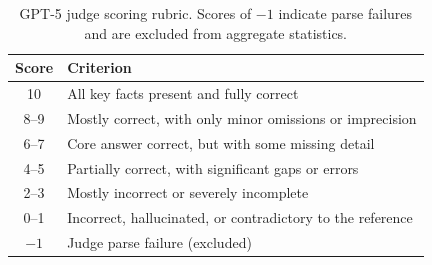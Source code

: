 \begin{table}[h]
\centering
\small
\begin{tabular}{cp{10cm}}
\toprule
\textbf{Score} & \textbf{Criterion} \\
\midrule
10   & All key facts present and fully correct \\
8--9 & Mostly correct, with only minor omissions or imprecision \\
6--7 & Core answer correct, but with some missing detail \\
4--5 & Partially correct, with significant gaps or errors \\
2--3 & Mostly incorrect or severely incomplete \\
0--1 & Incorrect, hallucinated, or contradictory to the reference \\
$-1$ & Judge parse failure (excluded) \\
\bottomrule
\end{tabular}
\caption{GPT-5 judge scoring rubric. Scores of $-1$ indicate parse failures and are
excluded from aggregate statistics.}
\label{tab:eval-rubric}
\end{table}